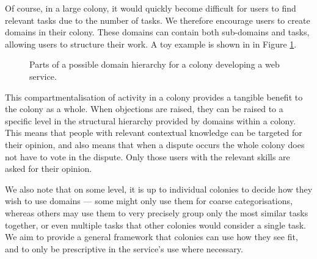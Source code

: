 Of course, in a large colony, it would quickly become difficult for users to find relevant tasks due to the number of tasks. We therefore encourage users to create domains in their colony. These domains can contain both sub-domains and tasks, allowing users to structure their work. A toy example is shown in in Figure \ref{fig:domainhierarchysample}. 

\begin{figure}[h]
    \centering
 \caption{Parts of a possible domain hierarchy for a colony developing a web service.}
 \label{fig:domainhierarchysample}

\end{figure}


This compartmentalisation of activity in a colony provides a tangible benefit to the colony as a whole. When objections are raised, they can be raised to a specific level in the structural hierarchy provided by domains within a colony. This means that people with relevant contextual knowledge can be targeted for their opinion, and also means that when a dispute occurs the whole colony does not have to vote in the dispute. Only those users with the relevant skills are asked for their opinion.

We also note that on some level, it is up to individual colonies to decide how they wish to use domains --- some might only use them for coarse categorisations, whereas others may use them to very precisely group only the most similar tasks together, or even multiple tasks that other colonies would consider a single task. We aim to provide a general framework that colonies can use how they see fit, and to only be prescriptive in the service's use where necessary.
